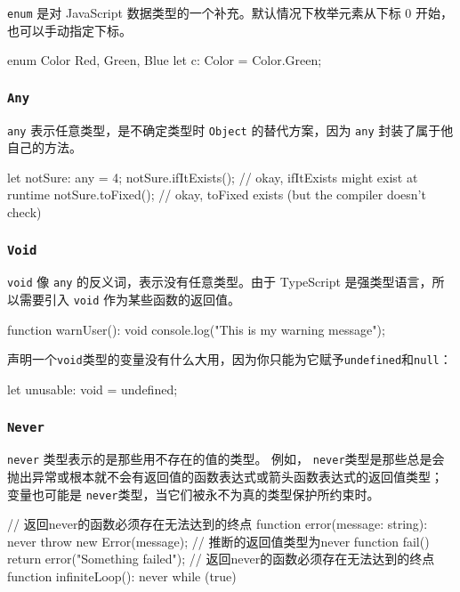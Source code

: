 \texttt{enum} 是对 JavaScript 数据类型的一个补充。默认情况下枚举元素从下标 0 开始，也可以手动指定下标。

\begin{TypeScript}
enum Color {Red, Green, Blue}
let c: Color = Color.Green;
\end{TypeScript}

\subsubsection*{\texttt{Any}}

\texttt{any} 表示任意类型，是不确定类型时 \texttt{Object} 的替代方案，因为 \texttt{any} 封装了属于他自己的方法。

\begin{TypeScript}
let notSure: any = 4;
notSure.ifItExists(); // okay, ifItExists might exist at runtime
notSure.toFixed(); // okay, toFixed exists (but the compiler doesn't check)
\end{TypeScript}

\subsubsection*{\texttt{Void}}

\texttt{void} 像 \texttt{any} 的反义词，表示没有任意类型。由于 TypeScript 是强类型语言，所以需要引入 \texttt{void} 作为某些函数的返回值。

\begin{TypeScript}
function warnUser(): void {
    console.log("This is my warning message");
}
\end{TypeScript}

声明一个\texttt{void}类型的变量没有什么大用，因为你只能为它赋予\texttt{undefined}和\texttt{null}：

\begin{TypeScript}
let unusable: void = undefined;
\end{TypeScript}

\subsubsection*{\texttt{Never}}

\texttt{never} 类型表示的是那些用不存在的值的类型。 例如， \texttt{never}类型是那些总是会抛出异常或根本就不会有返回值的函数表达式或箭头函数表达式的返回值类型； 变量也可能是 \texttt{never}类型，当它们被永不为真的类型保护所约束时。

\begin{TypeScript}
// 返回never的函数必须存在无法达到的终点
function error(message: string): never {
    throw new Error(message);
}
// 推断的返回值类型为never
function fail() {
    return error("Something failed");
}
// 返回never的函数必须存在无法达到的终点
function infiniteLoop(): never {
    while (true) {
    }
}
\end{TypeScript}

